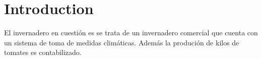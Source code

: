 \chapter{Introduction}
    
El invernadero en cuestión es se trata de un invernadero comercial que cuenta con un sistema de toma de medidas climáticas. Además la produción de kilos de tomates es contabilizado.

